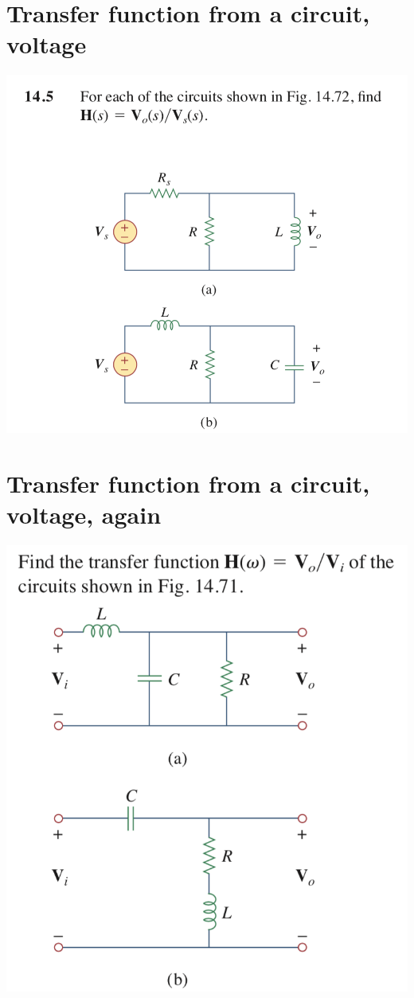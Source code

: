 \documentclass[11pt]{book}
\begin{document}
\newpage

\section{Transfer function from a circuit, voltage}
\begin{center}
	\includegraphics[width=\textwidth]{figures/q3.29.png} 
\end{center}

\newpage

\section{Transfer function from a circuit, voltage, again}
\begin{center}
	\includegraphics[width=\textwidth]{figures/q3.31.png} 
\end{center}
\end{document}
